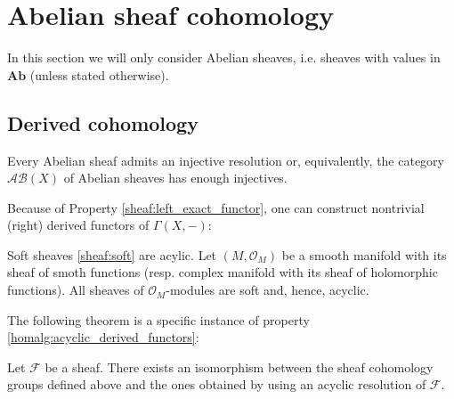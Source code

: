 \section{Abelian sheaf cohomology}

    In this section we will only consider Abelian sheaves, i.e. sheaves with values in $\mathbf{Ab}$ (unless stated otherwise).

\subsection{Derived cohomology}

    \begin{property}
        Every Abelian sheaf admits an injective resolution or, equivalently, the category $\mathcal{AB}(X)$ of Abelian sheaves has enough injectives.
    \end{property}
    Because of Property \ref{sheaf:left_exact_functor}, one can construct nontrivial (right) derived functors of $\Gamma(X,-)$:

    \begin{example}\label{sheaf:example_soft}
        Soft sheaves \ref{sheaf:soft} are acylic. Let $(M,\mathcal{O}_M)$ be a smooth manifold with its sheaf of smoth functions (resp. complex manifold with its sheaf of holomorphic functions). All sheaves of $\mathcal{O}_M$-modules are soft and, hence, acyclic.
    \end{example}

    The following theorem is a specific instance of property \ref{homalg:acyclic_derived_functors}:
    \begin{theorem}
        Let $\mathcal{F}$ be a sheaf. There exists an isomorphism between the sheaf cohomology groups defined above and the ones obtained by using an acyclic resolution of $\mathcal{F}$.
    \end{theorem}

